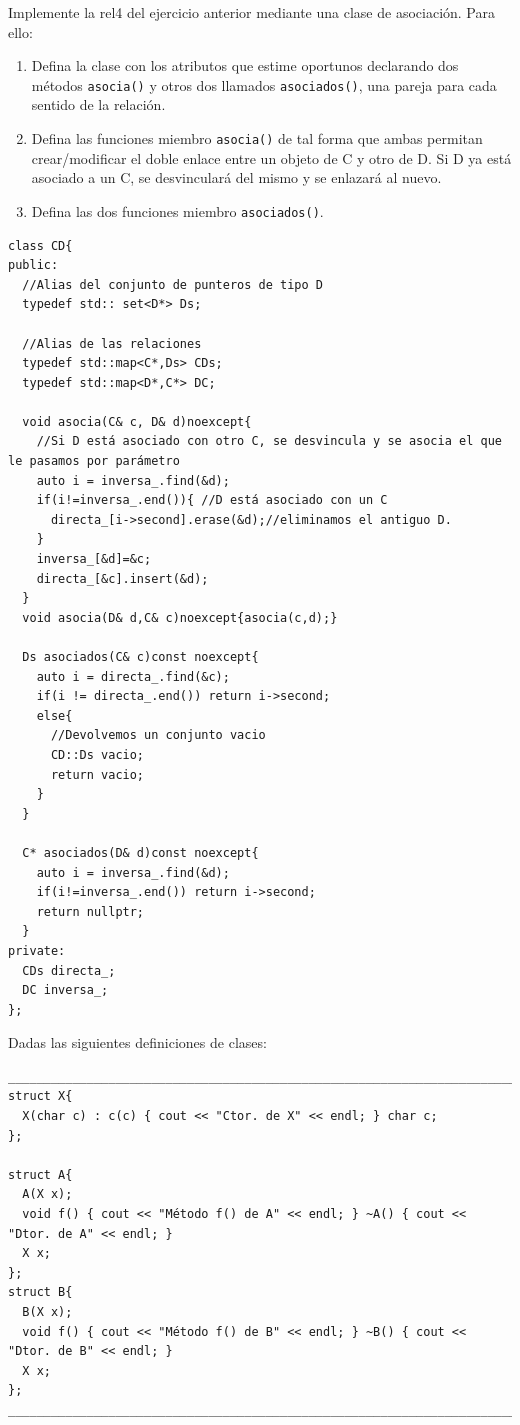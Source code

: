 \newpage
{} Implemente la rel4 del ejercicio anterior mediante una clase de asociación. Para ello:

\begin{enumerate}[label = \alph*)]
  \item Defina la clase con los atributos que estime oportunos declarando dos métodos \texttt{asocia()} y otros dos llamados \texttt{asociados()}, una pareja para cada sentido de la relación.
  \item Defina las funciones miembro \texttt{asocia()} de tal forma que ambas permitan crear/modificar el doble enlace entre un objeto de C y otro de D. Si D ya está asociado a un C, se desvinculará del mismo y se enlazará al nuevo.
  \item Defina las dos funciones miembro \texttt{asociados()}.
\end{enumerate}
\begin{verbatim}
class CD{
public:
  //Alias del conjunto de punteros de tipo D
  typedef std:: set<D*> Ds;
  
  //Alias de las relaciones
  typedef std::map<C*,Ds> CDs;
  typedef std::map<D*,C*> DC;

  void asocia(C& c, D& d)noexcept{
    //Si D está asociado con otro C, se desvincula y se asocia el que le pasamos por parámetro
    auto i = inversa_.find(&d);
    if(i!=inversa_.end()){ //D está asociado con un C
      directa_[i->second].erase(&d);//eliminamos el antiguo D.
    }
    inversa_[&d]=&c;
    directa_[&c].insert(&d);
  }
  void asocia(D& d,C& c)noexcept{asocia(c,d);}

  Ds asociados(C& c)const noexcept{
    auto i = directa_.find(&c);
    if(i != directa_.end()) return i->second;
    else{
      //Devolvemos un conjunto vacio
      CD::Ds vacio;
      return vacio;
    }
  }

  C* asociados(D& d)const noexcept{
    auto i = inversa_.find(&d);
    if(i!=inversa_.end()) return i->second;
    return nullptr;
  }
private:
  CDs directa_;
  DC inversa_;
};
\end{verbatim}
 Dadas las siguientes definiciones de clases:
\begin{center}
  \begin{verbatim}
________________________________________________________________________________
struct X{
  X(char c) : c(c) { cout << "Ctor. de X" << endl; } char c;
};

struct A{ 
  A(X x);
  void f() { cout << "Método f() de A" << endl; } ~A() { cout << "Dtor. de A" << endl; }
  X x;
};
struct B{
  B(X x);
  void f() { cout << "Método f() de B" << endl; } ~B() { cout << "Dtor. de B" << endl; }
  X x;
};
________________________________________________________________________________
  \end{verbatim}
\end{center}
